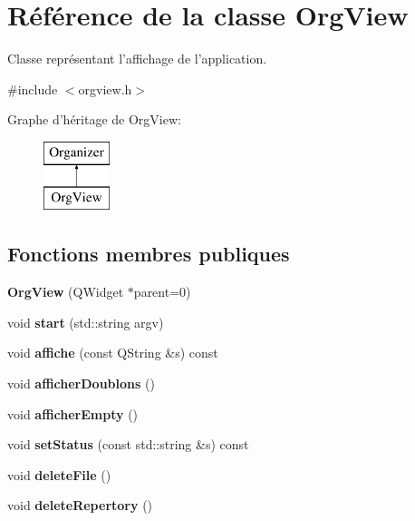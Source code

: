 \section{Référence de la classe Org\-View}
\label{class_org_view}


Classe représentant l'affichage de l'application.  




{\ttfamily \#include $<$orgview.\-h$>$}

Graphe d'héritage de Org\-View\-:\begin{figure}[H]
\begin{center}
\leavevmode
\includegraphics[height=2.000000cm]{class_org_view}
\end{center}
\end{figure}
\subsection*{Fonctions membres publiques}
\begin{DoxyCompactItemize}
\item 
{\bfseries Org\-View} (Q\-Widget $\ast$parent=0)\label{class_org_view_ab246039c316ff51bd026ce921f00ea55}

\item 
void {\bfseries start} (std\-::string argv)\label{class_org_view_a618029b070b1d60a49fe0696eb5be20c}

\item 
void {\bfseries affiche} (const Q\-String \&s) const \label{class_org_view_a1b58721da984696fdb169f647870291d}

\item 
void {\bfseries afficher\-Doublons} ()\label{class_org_view_a966ec26e20729e28a7acb677f87cda75}

\item 
void {\bfseries afficher\-Empty} ()\label{class_org_view_af4c32eb015b846328e0bee4ab5ea9609}

\item 
void {\bfseries set\-Status} (const std\-::string \&s) const \label{class_org_view_a327ad745c797b4f746c79d77fc153525}

\item 
void {\bfseries delete\-File} ()\label{class_org_view_a76cd92af0cd2b4c2b7c1de215e1b4536}

\item 
void {\bfseries delete\-Repertory} ()\label{class_org_view_a73840a460338c6eede65c28b2a9454c0}

\end{DoxyCompactItemize}
